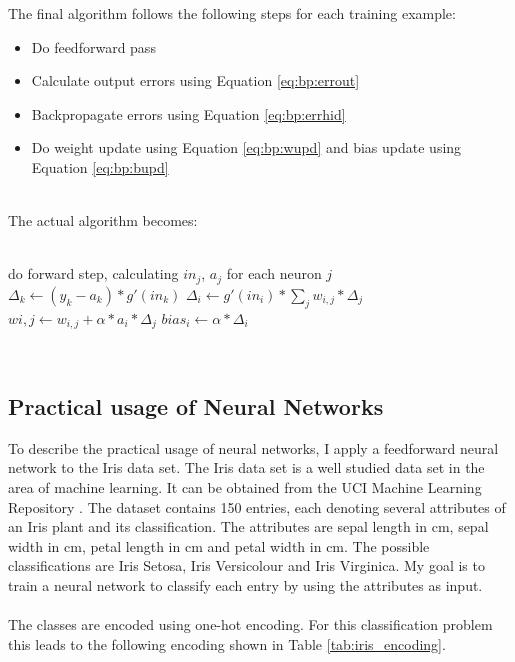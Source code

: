 The final algorithm follows the following steps for each training example: 
\begin{itemize}
\item Do feedforward pass	
\item Calculate output errors using Equation \ref{eq:bp:errout}
\item Backpropagate errors using Equation \ref{eq:bp:errhid}
\item Do weight update using Equation \ref{eq:bp:wupd} and bias update using Equation \ref{eq:bp:bupd}
\end{itemize}
~\\ 
The actual algorithm becomes:
\\
\\
\begin{algorithm}[H]
	
	do forward step, calculating $in_j$, $a_j$ for each neuron $j$\\
	 {
		$\Delta_k \leftarrow (y_k - a_k) * g'(in_k)$
	}
	 {
		 {
			$ \Delta_i \leftarrow g'(in_i) * \sum_j w_{i,j} * \Delta_j$
		}
	}
	 {
		$ w{i,j} \leftarrow w_{i,j} + \alpha * a_i * \Delta_j $
	}
	 {
		$ bias_i \leftarrow  \alpha * \Delta_i $
	}
\end{algorithm}
~\\
 
 
\subsection{Practical usage of Neural Networks}


To describe the practical usage of neural networks, I apply a feedforward neural network to the Iris data set. The Iris data set is a well studied data set in the area of machine learning. It can be obtained from the UCI Machine Learning Repository \cite{UCI}. The dataset contains 150 entries, each denoting several attributes of an Iris plant and its classification. The attributes are sepal length in cm, sepal width in cm, petal length in cm and petal width in cm. The possible classifications are Iris Setosa, Iris Versicolour and Iris Virginica. My goal is to train a neural network to classify each entry by using the attributes as input. 
\\
\\
The classes are encoded using one-hot encoding. For this classification problem this leads to the following encoding shown in Table \ref{tab:iris_encoding}.

